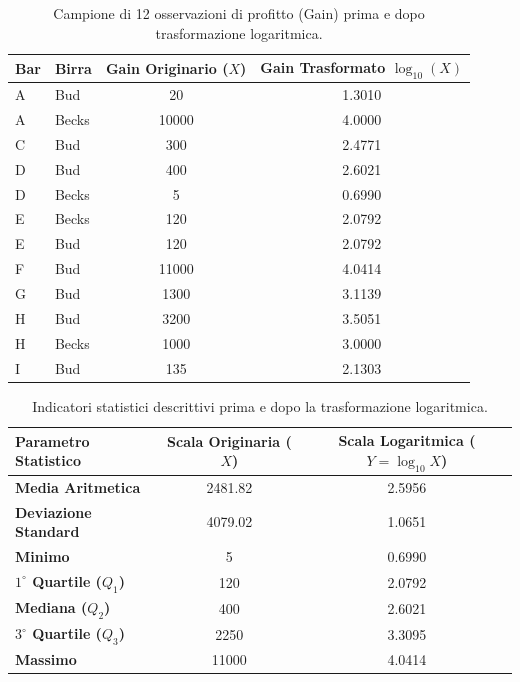 \begin{table}[htbp]
    \centering
    \small
    \begin{tabular}{llcc}
        \toprule
        \textbf{Bar} & \textbf{Birra} & \textbf{Gain Originario ($X$)} & \textbf{Gain Trasformato $\log_{10}(X)$} \\
        \midrule
        A & Bud   & 20    & 1.3010 \\
        A & Becks & 10000 & 4.0000 \\
        C & Bud   & 300   & 2.4771 \\
        D & Bud   & 400   & 2.6021 \\
        D & Becks & 5     & 0.6990 \\
        E & Becks & 120   & 2.0792 \\
        E & Bud   & 120   & 2.0792 \\
        F & Bud   & 11000 & 4.0414 \\
        G & Bud   & 1300  & 3.1139 \\
        H & Bud   & 3200  & 3.5051 \\
        H & Becks & 1000  & 3.0000 \\
        I & Bud   & 135   & 2.1303 \\
        \bottomrule
    \end{tabular}
    \caption{Campione di 12 osservazioni di profitto (Gain) prima e dopo trasformazione logaritmica.}
    \label{tab:dm-log-transform-sample}
\end{table}

\begin{table}[htbp]
    \centering
    \small
    \begin{tabularx}{\textwidth}{Xcc}
        \toprule
        \textbf{Parametro Statistico} & \textbf{Scala Originaria ($X$)} & \textbf{Scala Logaritmica ($Y = \log_{10} X$)} \\
        \midrule
        \textbf{Media Aritmetica} & 2481.82 & 2.5956 \\
        \textbf{Deviazione Standard} & 4079.02 & 1.0651 \\
        \textbf{Minimo} & 5 & 0.6990 \\
        \textbf{$1^\circ$ Quartile ($Q_1$)} & 120 & 2.0792 \\
        \textbf{Mediana ($Q_2$)} & 400 & 2.6021 \\
        \textbf{$3^\circ$ Quartile ($Q_3$)} & 2250 & 3.3095 \\
        \textbf{Massimo} & 11000 & 4.0414 \\
        \bottomrule
    \end{tabularx}
    \caption{Indicatori statistici descrittivi prima e dopo la trasformazione logaritmica.}
    \label{tab:dm-log-transform-stats}
\end{table}

